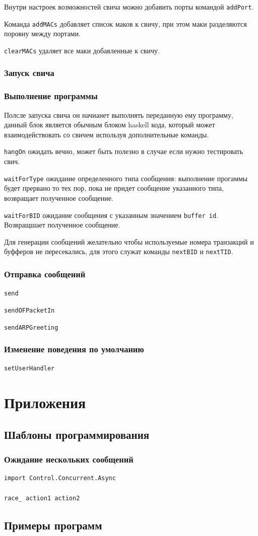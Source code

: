 \documentclass[9pt,a4paper]{article}
\begin{document}
Внутри настроек возможностей свича можно добавить порты командой \lstinline!addPort!.

Команда \lstinline!addMACs! добавляет список маков к свичу, при этом маки разделяются
поровну между портами.

\lstinline!clearMACs! удаляет все маки добавленные к свичу.


\subsubsection{Запуск свича}
\subsubsection{Выполнение программы}
Полсле запуска  свича он начианет выполнять переданную ему программу, данный блок 
является обычным блоком haskell кода, который может взаимодействовать со свичем
используя дополнительные команды.

\lstinline!hangOn! ожидать вечно, может быть полезно в случае если нужно тестировать
свич.

\lstinline!waitForType! ожидание определенного типа сообщения: выполнение прогаммы
будет прервано то тех пор, пока не придет сообщение указанного типа, возвращает 
полученное сообщение.

\lstinline!waitForBID! ожидание сообщения с указанным значением \texttt{buffer id}.
Возвращшает полученное сообщение.

Для генерации сообщений желательно чтобы используемые номера транзакций и буфферов 
не пересекались, для этого служат команды \lstinline!nextBID! и \lstinline!nextTID!.

\subsubsection{Отправка сообщений}

\lstinline!send!

\lstinline!sendOFPacketIn!

\lstinline!sendARPGreeting!

\subsubsection{Изменение поведения по умолчанию}

\lstinline!setUserHandler!

\section{Приложения}
\subsection{Шаблоны программирования}
\subsubsection{Ожидание нескольких сообщений}

\begin{lstlisting}
import Control.Concurrent.Async

race_ action1 action2
\end{lstlisting}

\subsection{Примеры программ}
\end{document}
